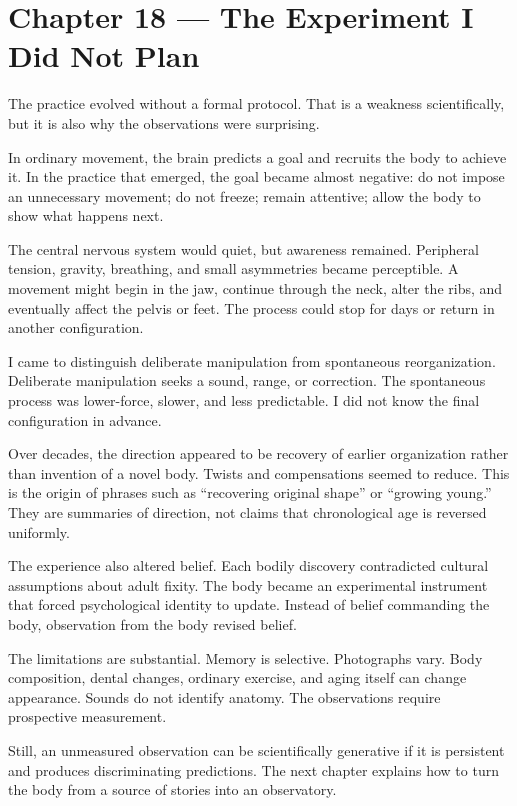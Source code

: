 \chapter{Chapter 18 --- The Experiment I Did Not Plan}\label{chapter-18-the-experiment-i-did-not-plan}

The practice evolved without a formal protocol. That is a weakness scientifically, but it is also why the observations were surprising.

In ordinary movement, the brain predicts a goal and recruits the body to achieve it. In the practice that emerged, the goal became almost negative: do not impose an unnecessary movement; do not freeze; remain attentive; allow the body to show what happens next.

The central nervous system would quiet, but awareness remained. Peripheral tension, gravity, breathing, and small asymmetries became perceptible. A movement might begin in the jaw, continue through the neck, alter the ribs, and eventually affect the pelvis or feet. The process could stop for days or return in another configuration.

I came to distinguish deliberate manipulation from spontaneous reorganization. Deliberate manipulation seeks a sound, range, or correction. The spontaneous process was lower-force, slower, and less predictable. I did not know the final configuration in advance.

Over decades, the direction appeared to be recovery of earlier organization rather than invention of a novel body. Twists and compensations seemed to reduce. This is the origin of phrases such as ``recovering original shape'' or ``growing young.'' They are summaries of direction, not claims that chronological age is reversed uniformly.

The experience also altered belief. Each bodily discovery contradicted cultural assumptions about adult fixity. The body became an experimental instrument that forced psychological identity to update. Instead of belief commanding the body, observation from the body revised belief.

The limitations are substantial. Memory is selective. Photographs vary. Body composition, dental changes, ordinary exercise, and aging itself can change appearance. Sounds do not identify anatomy. The observations require prospective measurement.

Still, an unmeasured observation can be scientifically generative if it is persistent and produces discriminating predictions. The next chapter explains how to turn the body from a source of stories into an observatory.

